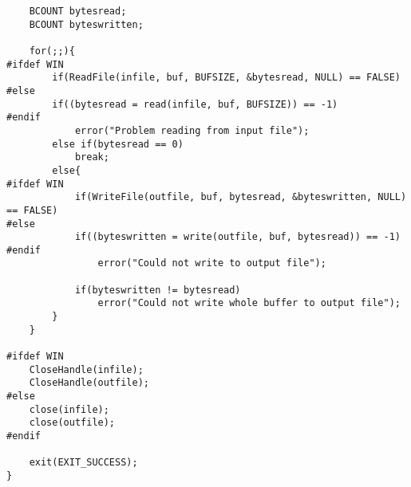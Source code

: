 \documentclass[letterpaper,10pt,fleqn]{article}
\numberwithin{equation}{section}
\begin{document}
\begin{verbatim}
    BCOUNT bytesread;
    BCOUNT byteswritten;

    for(;;){
#ifdef WIN
        if(ReadFile(infile, buf, BUFSIZE, &bytesread, NULL) == FALSE)
#else
        if((bytesread = read(infile, buf, BUFSIZE)) == -1)
#endif
            error("Problem reading from input file");
        else if(bytesread == 0)
            break;
        else{
#ifdef WIN
            if(WriteFile(outfile, buf, bytesread, &byteswritten, NULL) == FALSE)
#else
            if((byteswritten = write(outfile, buf, bytesread)) == -1)
#endif
                error("Could not write to output file");
            
            if(byteswritten != bytesread)
                error("Could not write whole buffer to output file");
        }
    }

#ifdef WIN
    CloseHandle(infile);
    CloseHandle(outfile);
#else
    close(infile);
    close(outfile);
#endif

    exit(EXIT_SUCCESS);
}
\end{verbatim}
\end{document}
